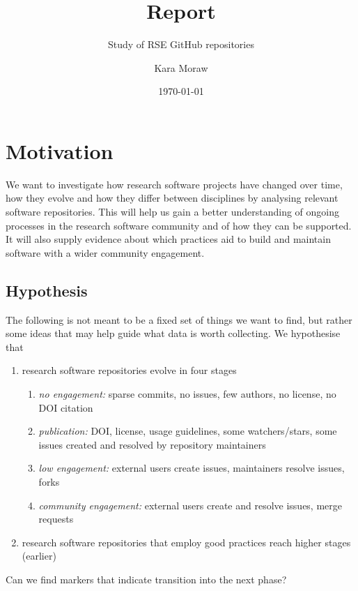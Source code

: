 \documentclass[10pt,a4paper]{scrartcl}
\begin{document}
\title{Report}
\subtitle{Study of RSE GitHub repositories}
\author{Kara Moraw}
\date{\today}
\maketitle

\section{Motivation}

We want to investigate how research software projects have changed over time, how they evolve and how they differ between disciplines by analysing relevant software repositories.
This will help us gain a better understanding of ongoing processes in the research software community and of how they can be supported.
It will also supply evidence about which practices aid to build and maintain software with a wider community engagement.

\subsection*{Hypothesis}

The following is not meant to be a fixed set of things we want to find, but rather some ideas that may help guide what data is worth collecting.
We hypothesise that
\begin{enumerate}
    \item research software repositories evolve in four stages
    \begin{enumerate}
        \item \textit{no engagement:} sparse commits, no issues, few authors, no license, no DOI citation
        \item \textit{publication:} DOI, license, usage guidelines, some watchers/stars, some issues created and resolved by repository maintainers
        \item \textit{low engagement:} external users create issues, maintainers resolve issues, forks
        \item \textit{community engagement:} external users create and resolve issues, merge requests
    \end{enumerate}
    \item research software repositories that employ good practices reach higher stages (earlier)
\end{enumerate}

Can we find markers that indicate transition into the next phase?
\end{document}
